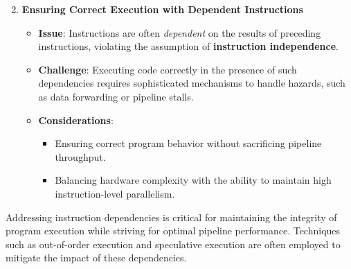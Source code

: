 \begin{enumerate}
    \setcounter{enumi}{1}
    \item \textbf{Ensuring Correct Execution with Dependent Instructions}
    \begin{itemize}
        \item \textbf{Issue}: Instructions are often \textit{dependent} on the results of preceding instructions, violating the assumption of \textbf{instruction independence}.
        \item \textbf{Challenge}: Executing code correctly in the presence of such dependencies requires sophisticated mechanisms to handle hazards, such as data forwarding or pipeline stalls.
        \item \textbf{Considerations}:
        \begin{itemize}
            \item Ensuring correct program behavior without sacrificing pipeline throughput.
            \item Balancing hardware complexity with the ability to maintain high instruction-level parallelism.
        \end{itemize}
    \end{itemize}
\end{enumerate}

Addressing instruction dependencies is critical for maintaining the integrity of program execution while striving for optimal pipeline performance. Techniques such as out-of-order execution and speculative execution are often employed to mitigate the impact of these dependencies.
